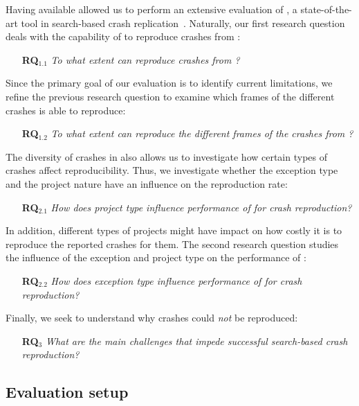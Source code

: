 
Having \crashpack available allowed us to perform an extensive evaluation of \evocrash, a state-of-the-art tool in search-based crash replication~\cite{Soltani2018a}.
Naturally, our first research question deals with the capability of \evocrash to reproduce crashes from \crashpack: 
%
\begin{itemize}
    \item[\textbf{RQ$_{1.1}$}] \textit{To what extent can \evocrash reproduce crashes from \crashpack?}
\end{itemize}
%
Since the primary goal of our evaluation is to identify current limitations, we refine the previous research question to examine which frames of the different crashes \evocrash is able to reproduce:
%
\begin{itemize}
    \item[\textbf{RQ$_{1.2}$}] \textit{To what extent can \evocrash reproduce the different frames of the crashes from \crashpack?}
\end{itemize}
%
The diversity of crashes in \crashpack also allows us to investigate how certain types of crashes affect reproducibility.
Thus, we investigate whether the exception type and  the project nature have an influence on the reproduction rate:
\begin{itemize}
   \item[\textbf{RQ$_{2.1}$}] \textit{How does project type influence performance of \evocrash for crash reproduction?}
\end{itemize}
In addition, different types of projects might have impact on how costly it is to reproduce the reported crashes for them.
The second research question studies the influence of the exception and project type on the performance of \evocrash:
%
\begin{itemize}
   \item[\textbf{RQ$_{2.2}$}] \textit{How does exception type influence performance of \evocrash for crash reproduction?}
\end{itemize}
%
Finally, we seek to understand why crashes could \emph{not} be reproduced:
%
\begin{itemize}
    \item[\textbf{RQ$_3$}] \textit{What are the main challenges that impede successful search-based crash reproduction?}
\end{itemize}

\subsection{Evaluation setup}
\label{se:evalsetup}

